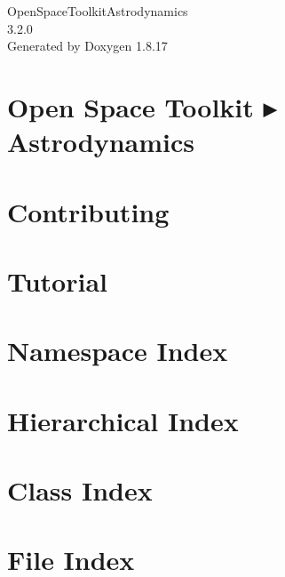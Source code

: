 \let\mypdfximage\pdfximage\def\pdfximage{\immediate\mypdfximage}\documentclass[twoside]{book}
\newcommand{\+}{\discretionary{\mbox{\scriptsize$\hookleftarrow$}}{}{}}
\newcommand{\clearemptydoublepage}{%
  \newpage{\pagestyle{empty}\cleardoublepage}%
}
\begin{document}
\hypersetup{pageanchor=false,
             bookmarksnumbered=true,
             pdfencoding=unicode
            }
\begin{titlepage}
\vspace*{7cm}
\begin{center}%
{\Large Open\+Space\+Toolkit\+Astrodynamics \\[1ex]\large 3.\+2.\+0 }\\
\vspace*{1cm}
{\large Generated by Doxygen 1.8.17}\\
\end{center}
\end{titlepage}
\clearemptydoublepage
{}
\tableofcontents
\clearemptydoublepage
{}
\hypersetup{pageanchor=true}

\chapter{Open Space Toolkit ▸ Astrodynamics}
\label{index}\hypertarget{index}{}
\chapter{Contributing}
\label{md__c_o_n_t_r_i_b_u_t_i_n_g}

\chapter{Tutorial}
\label{md_docs__tutorial}

\chapter{Namespace Index}

\chapter{Hierarchical Index}

\chapter{Class Index}

\chapter{File Index}

\end{document}
